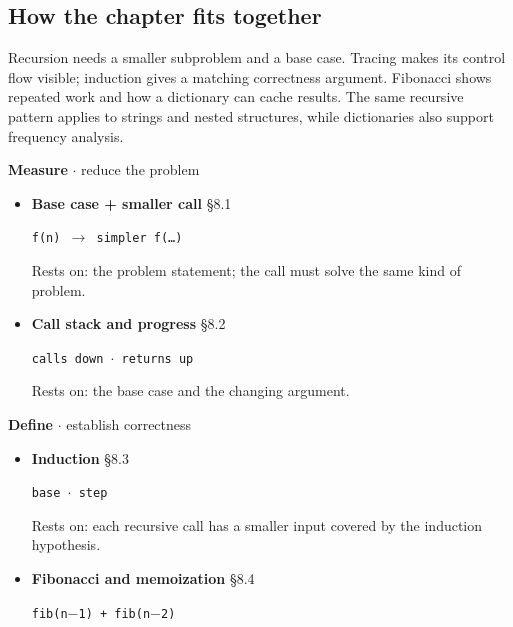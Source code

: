 \documentclass[11pt]{article}
\begin{document}
\begin{keepsection}
\section{How the chapter fits together}

Recursion needs a smaller subproblem and a base case. Tracing makes its control flow visible; induction gives a matching correctness argument. Fibonacci shows repeated work and how a dictionary can cache results. The same recursive pattern applies to strings and nested structures, while dictionaries also support frequency analysis.

\textbf{Measure} \ensuremath{\cdot} reduce the problem

\begin{itemize}
\item {}
\textbf{Base case + smaller call} \hfill{\small\color{FAUblue}§8.1}

\texttt{f(n) \ensuremath{\to} simpler f(…)}

Rests on: the problem statement; the call must solve the same kind of problem.
\item {}
\textbf{Call stack and progress} \hfill{\small\color{FAUblue}§8.2}

\texttt{calls down \ensuremath{\cdot} returns up}

Rests on: the base case and the changing argument.
\end{itemize}

\textbf{Define} \ensuremath{\cdot} establish correctness

\begin{itemize}
\item {}
\textbf{Induction} \hfill{\small\color{FAUblue}§8.3}

\texttt{base \ensuremath{\cdot} step}

Rests on: each recursive call has a smaller input covered by the induction hypothesis.
\item {}
\textbf{Fibonacci and memoization} \hfill{\small\color{FAUblue}§8.4}

\texttt{fib(n\ensuremath{-}1) + fib(n\ensuremath{-}2)}


\end{itemize}
\end{keepsection}
\end{document}
